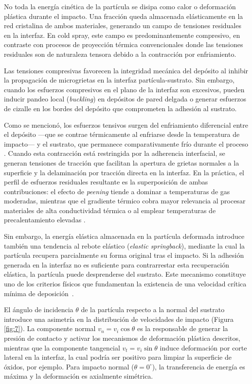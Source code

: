 No toda la energía cinética de la partícula se disipa como calor o deformación 
plástica durante el impacto. Una fracción queda almacenada elásticamente en la 
red cristalina de ambos materiales, generando un campo de tensiones residuales 
en la interfaz. En cold spray, este campo es predominantemente compresivo, 
en contraste con procesos de proyección térmica convencionales donde las 
tensiones residuales son de naturaleza tensora debido a la contracción por enfriamiento. 

Las tensiones compresivas favorecen la integridad mecánica del depósito al inhibir la propagación de microgrietas en la interfaz 
partícula-sustrato\cite{Champagne2016unique}. Sin embargo, cuando los esfuerzos compresivos en el plano de la interfaz son excesivos, pueden inducir pandeo local (\textit{buckling}) en depósitos de pared delgada o generar esfuerzos de cizalle en los bordes del depósito que comprometen la adhesión al sustrato.

Como se mencionó, los esfuerzos tensivos surgen del enfriamiento diferencial entre el depósito —que se contrae térmicamente al enfriarse desde la temperatura de impacto— y el sustrato, que permanece comparativamente frío durante el proceso \cite{Yin2022review}. Cuando esta contracción está restringida por la adherencia interfacial, se generan tensiones de tracción que facilitan la apertura de grietas normales a la superficie y la delaminación por tracción directa en la interfaz. En la práctica, el perfil de esfuerzos residuales resultante es la superposición de ambas contribuciones: el efecto de \textit{peening} tiende a dominar a temperaturas de gas moderadas, mientras que el gradiente térmico cobra mayor relevancia al procesar materiales de alta conductividad térmica o al emplear temperaturas de precalentamiento elevadas \cite{Moridi2014}.

Sin embargo, la energía elástica almacenada en la partícula deformada introduce 
también una tendencia al rebote elástico (\textit{elastic springback}), mediante 
la cual la partícula recupera parcialmente su forma original tras el impacto. 
Si la adhesión generada en la interfaz no es suficiente para contrarrestar esta 
recuperación elástica, la partícula puede desprenderse del sustrato. Este 
mecanismo constituye uno de los criterios físicos que fundamentan la existencia 
de una velocidad crítica mínima de deposición~\cite{Schmidt2006}.

El ángulo de incidencia $\theta$ de la partícula respecto a la normal 
del sustrato introduce una asimetría en la distribución de velocidades 
de impacto (Figura \ref{fig:7}). La componente normal $v_n = v_i \cos\theta$ es la 
responsable de generar la presión de contacto y activar los mecanismos 
de deformación plástica descritos, mientras que la componente 
tangencial $v_t = v_i \sin\theta$ induce deformación por corte lateral 
en la interfaz, la cual podría ser positivo para limpiar la superficie de óxidos, por ejemplo. Para impacto normal ($\theta = 0^{\circ}$), la transferencia 
de energía es máxima y la deformación es axialmente simétrica.

